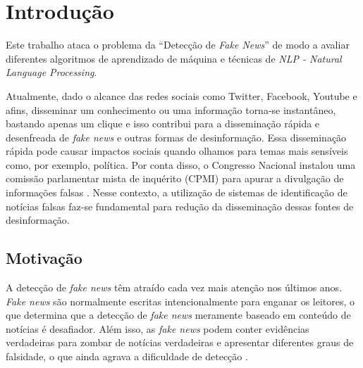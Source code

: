 \section{Introdução}

 Este trabalho ataca o problema da ``Detecção de \textit{Fake News}''\cite{ZHANG2020102025} de modo a avaliar diferentes algoritmos de aprendizado de máquina e técnicas de \textit{NLP - \textit{Natural Language Processing}}. 

Atualmente, dado o alcance das redes sociais como Twitter, Facebook, Youtube e afins, disseminar um conhecimento ou uma informação torna-se instantâneo, bastando apenas um clique e isso contribui para a disseminação rápida e desenfreada de \textit{fake news} e outras formas de desinformação. Essa disseminação rápida pode causar impactos sociais quando olhamos para temas mais sensíveis como, por exemplo, política. Por conta disso, o Congresso Nacional instalou uma comissão parlamentar mista de inquérito (CPMI)  para apurar a divulgação de informações falsas \citep{g12019}. Nesse contexto, a utilização de sistemas de identificação de notícias falsas faz-se fundamental para redução da disseminação dessas fontes de desinformação.






\subsection{Motivação}



A  detecção de \textit{fake news} têm atraído cada vez mais atenção nos últimos anos. \textit{Fake news} são normalmente escritas intencionalmente para enganar os leitores, o que determina que a detecção de \textit{fake news} meramente baseado em conteúdo de notícias é  desafiador.
Além isso, as \textit{fake news} podem conter evidências verdadeiras para zombar de notícias verdadeiras e apresentar diferentes graus de falsidade, o que ainda agrava a dificuldade de detecção \cite{karimi2018}. 

